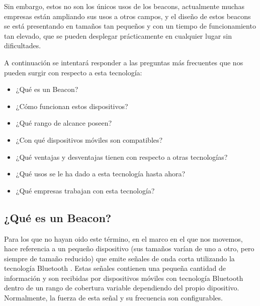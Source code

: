 Sin embargo, estos no son los únicos usos de los beacons, actualmente muchas empresas están ampliando sus usos a otros campos, y el diseño de estos beacons se está presentando en tamaños tan pequeños y con un tiempo de funcionamiento tan elevado, que se pueden desplegar prácticamente en cualquier lugar sin dificultades.

A continuación se intentará responder a las preguntas más frecuentes que nos pueden surgir con respecto a esta tecnología:


\begin{itemize}
\item ¿Qué es un Beacon?
\item ¿Cómo funcionan estos dispositivos?
\item ¿Qué rango de alcance poseen?
\item ¿Con qué dispositivos móviles son compatibles? 
\item ¿Qué ventajas y desventajas tienen con respecto a otras tecnologías?
\item ¿Qué usos se le ha dado a esta tecnología hasta ahora?
\item ¿Qué empresas trabajan con esta tecnología?
\end{itemize}

\begin{figure}[!h]
        \begin{floatrow}
        \end{floatrow}
\end{figure}

\subsection{¿Qué es un Beacon?}

Para los que no hayan oido este término, en el marco en el que nos movemos, hace referencia a un pequeño dispositivo (sus tamaños varían de uno a otro, pero siempre de tamaño reducido) que emite señales de onda corta utilizando la tecnología Bluetooth \cite{URL::Bluetooth}. Estas señales contienen una pequeña cantidad de información y son recibidas por dispositivos móviles con tecnología Bluetooth dentro de un rango de cobertura variable dependiendo del propio dipositivo. Normalmente, la fuerza de esta señal y su frecuencia son configurables.

